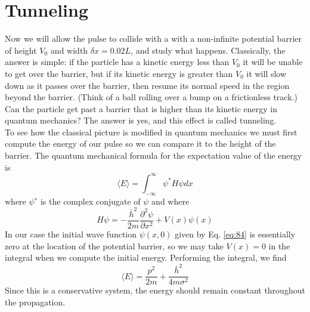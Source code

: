 \section*{Tunneling}
Now we will allow the pulse to collide with a with a non-infinite potential barrier
of height $V_0$ and width $\delta x = 0.02L$, and study what happens. Classically, the
answer is simple: if the particle has a kinetic energy less than $V_0$ it will be unable
to get over the barrier, but if its kinetic energy is greater than $V_0$ it will slow down
as it passes over the barrier, then resume its normal speed in the region beyond
the barrier. (Think of a ball rolling over a bump on a frictionless track.) Can
the particle get past a barrier that is higher than its kinetic energy in quantum
mechanics? The answer is yes, and this effect is called tunneling. \\ 
To see how the classical picture is modified in quantum mechanics we must
first compute the energy of our pulse so we can compare it to the height of the
barrier. The quantum mechanical formula for the expectation value of the energy
is
\begin{equation}\label{eq:86}
\langle E\rangle=\int_{-\infty}^{\infty} \psi^{*} H \psi d x
\end{equation}
where $\psi^∗$ is the complex conjugate of $\psi$ and where
\begin{equation}\label{eq:87}
H \psi=-\frac{\bar{h}^{2}}{2 m} \frac{\partial^{2} \psi}{\partial x^{2}}+V(x) \psi(x)
\end{equation}
In our case the initial wave function $\psi(x,0)$ given by Eq. \eqref{eq:84} is essentially zero at
the location of the potential barrier, so we may take $V(x) = 0$ in the integral when
we compute the initial energy. Performing the integral, we find
\begin{equation}\label{eq:88}
\langle E\rangle=\frac{p^{2}}{2 m}+\frac{\bar{h}^{2}}{4 m \sigma^{2}}
\end{equation}
Since this is a conservative system, the energy should remain constant throughout
the propagation.
